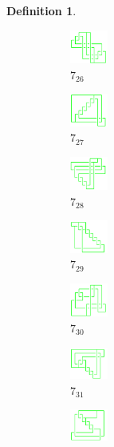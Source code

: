 \documentclass{article}
\theoremstyle{definition}
\newtheorem{defn}[thm]{Definition}
\theoremstyle{theorem}
\theoremstyle{proposition}
\theoremstyle{corollary}
\begin{document}
\begin{defn}
\begin{figure}[H]
    \begin{subfigure}{0.075\textwidth}
    \includegraphics[width=1.25cm]{../Midterm_Poster/grid_diagram/theta_7_26.png}
    \caption{$7_{26}$} 
    \end{subfigure}
    \begin{subfigure}{0.075\textwidth}
    \includegraphics[width=1.25cm]{../Midterm_Poster/grid_diagram/theta_7_27.png}
    \caption{$7_{27}$} 
    \end{subfigure}
    \begin{subfigure}{0.075\textwidth}
    \includegraphics[width=1.25cm]{../Midterm_Poster/grid_diagram/theta_7_28.png}
    \caption{$7_{28}$} 
    \end{subfigure}
    \begin{subfigure}{0.075\textwidth}
    \includegraphics[width=1.25cm]{../Midterm_Poster/grid_diagram/theta_7_29.png}
    \caption{$7_{29}$} 
    \end{subfigure}
    \begin{subfigure}{0.075\textwidth}
    \includegraphics[width=1.25cm]{../Midterm_Poster/grid_diagram/theta_7_30.png}
    \caption{$7_{30}$}
    \end{subfigure}
    \begin{subfigure}{0.075\textwidth}
    \includegraphics[width=1.25cm]{../Midterm_Poster/grid_diagram/theta_7_31.png}
    \caption{$7_{31}$} 
    \end{subfigure}
    \begin{subfigure}{0.075\textwidth}
    \includegraphics[width=1.25cm]{../Midterm_Poster/grid_diagram/theta_7_32.png}

\end{subfigure}
\end{figure}
\end{defn}
\end{document}
